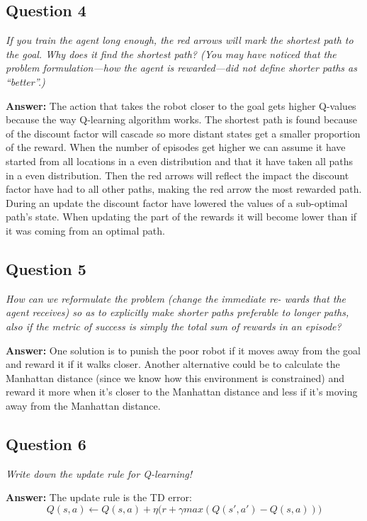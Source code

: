 \documentclass[a4paper]{article}
\begin{document}
\subsection*{Question 4}
\emph{If you train the agent long enough, the red arrows will mark the
shortest path to the goal. Why does it find the shortest path? (You may have noticed that the problem formulation—how the agent is rewarded—did not define shorter paths as ``better''.)}

\textbf{Answer:} The action that takes the robot closer to the goal gets higher Q-values because the way Q-learning algorithm works. The shortest path is found because of the discount factor will cascade so more distant states get a smaller proportion of the reward. When the number of episodes get higher we can assume it have started from all locations in a even distribution and that it have taken all paths in a even distribution. Then the red arrows will reflect the impact the discount factor have had to all other paths, making the red arrow the most rewarded path.
During an update the discount factor have lowered the values of a sub-optimal path's state. When updating the part of the rewards it will become lower than if it was coming from an optimal path. 

\subsection*{Question 5}
\emph{How can we reformulate the problem (change the immediate re-
wards that the agent receives) so as to explicitly make shorter paths preferable to longer paths, also if the metric of success is simply the total sum of rewards in an episode?}

\textbf{Answer:} One solution is to punish the poor robot if it moves away from the goal and reward it if it walks closer. 
Another alternative could be to calculate the Manhattan distance (since we know how this environment is constrained) and reward it more when it's closer to the Manhattan distance and less if it's moving away from the Manhattan distance.

\subsection*{Question 6}
\emph{Write down the update rule for Q-learning!}

\textbf{Answer:} 
The update rule is the TD error:
\begin{equation*}
Q(s, a) \leftarrow Q(s, a) + \eta \bigg( r + \gamma max(Q(s', a') - Q(s, a)) \bigg)
\end{equation*}
\end{document}
